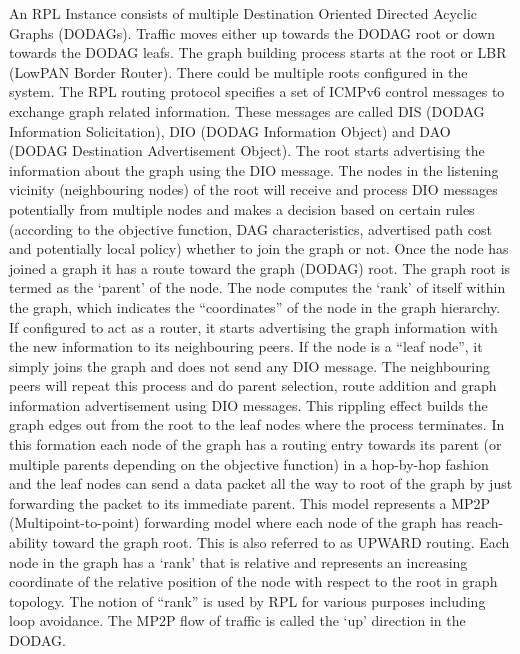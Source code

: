 An RPL Instance consists of multiple Destination Oriented Directed Acyclic Graphs (DODAGs).
Traffic moves either up towards the DODAG root or down towards the DODAG leafs.
The graph building process starts at the root or LBR (LowPAN Border Router).
There could be multiple roots configured in the system.
The RPL routing protocol specifies a set of ICMPv6 control messages to exchange graph related information.
These messages are called DIS (DODAG Information Solicitation),
	DIO (DODAG Information Object) and DAO (DODAG Destination Advertisement Object).
The root starts advertising the information about the graph using the DIO message.
The nodes in the listening vicinity (neighbouring nodes) of the root will receive and process DIO messages potentially from multiple nodes and makes a decision based on certain rules (according to the objective function,
	DAG characteristics,
	advertised path cost and potentially local policy) whether to join the graph or not.
Once the node has joined a graph it has a route toward the graph (DODAG) root.
The graph root is termed as the ‘parent’ of the node.
The node computes the ‘rank’ of itself within the graph,
	which indicates the “coordinates” of the node in the graph hierarchy.
If configured to act as a router,
	it starts advertising the graph information with the new information to its neighbouring peers.
If the node is a “leaf node”,
	it simply joins the graph and does not send any DIO message.
The neighbouring peers will repeat this process and do parent selection,
	route addition and graph information advertisement using DIO messages.
This rippling effect builds the graph edges out from the root to the leaf nodes where the process terminates.
In this formation each node of the graph has a routing entry towards its parent (or multiple parents depending on the objective function) in a hop-by-hop fashion and the leaf nodes can send a data packet all the way to root of the graph by just forwarding the packet to its immediate parent.
This model represents a MP2P (Multipoint-to-point) forwarding model where each node of the graph has reach-ability toward the graph root.
This is also referred to as UPWARD routing.
Each node in the graph has a ‘rank’ that is relative and represents an increasing coordinate of the relative position of the node with respect to the root in graph topology.
The notion of “rank” is used by RPL for various purposes including loop avoidance.
The MP2P flow of traffic is called the ‘up’ direction in the DODAG.


